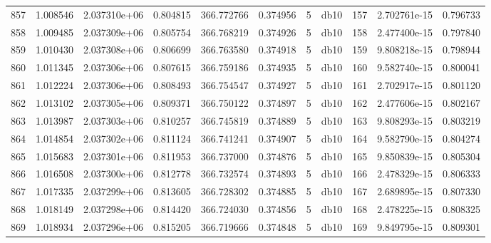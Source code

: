 \begin{tabular}{lrrrrrrlrrr}
857  &    1.008546 &        2.037310e+06 &  0.804815 &              366.772766 &    0.374956 &       5 &         db10 &    157 &   2.702761e-15 &      0.796733 \\
858  &    1.009485 &        2.037309e+06 &  0.805754 &              366.768219 &    0.374926 &       5 &         db10 &    158 &   2.477400e-15 &      0.797840 \\
859  &    1.010430 &        2.037308e+06 &  0.806699 &              366.763580 &    0.374918 &       5 &         db10 &    159 &   9.808218e-15 &      0.798944 \\
860  &    1.011345 &        2.037306e+06 &  0.807615 &              366.759186 &    0.374935 &       5 &         db10 &    160 &   9.582740e-15 &      0.800041 \\
861  &    1.012224 &        2.037306e+06 &  0.808493 &              366.754547 &    0.374927 &       5 &         db10 &    161 &   2.702917e-15 &      0.801120 \\
862  &    1.013102 &        2.037305e+06 &  0.809371 &              366.750122 &    0.374897 &       5 &         db10 &    162 &   2.477606e-15 &      0.802167 \\
863  &    1.013987 &        2.037303e+06 &  0.810257 &              366.745819 &    0.374889 &       5 &         db10 &    163 &   9.808293e-15 &      0.803219 \\
864  &    1.014854 &        2.037302e+06 &  0.811124 &              366.741241 &    0.374907 &       5 &         db10 &    164 &   9.582790e-15 &      0.804274 \\
865  &    1.015683 &        2.037301e+06 &  0.811953 &              366.737000 &    0.374876 &       5 &         db10 &    165 &   9.850839e-15 &      0.805304 \\
866  &    1.016508 &        2.037300e+06 &  0.812778 &              366.732574 &    0.374893 &       5 &         db10 &    166 &   2.478329e-15 &      0.806333 \\
867  &    1.017335 &        2.037299e+06 &  0.813605 &              366.728302 &    0.374885 &       5 &         db10 &    167 &   2.689895e-15 &      0.807330 \\
868  &    1.018149 &        2.037298e+06 &  0.814420 &              366.724030 &    0.374856 &       5 &         db10 &    168 &   2.478225e-15 &      0.808325 \\
869  &    1.018934 &        2.037296e+06 &  0.815205 &              366.719666 &    0.374848 &       5 &         db10 &    169 &   9.849795e-15 &      0.809301 \\

\end{tabular}
